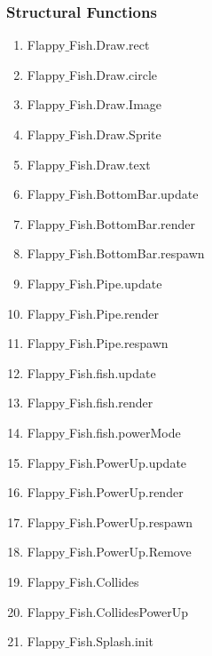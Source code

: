 \documentclass[11pt, oneside]{article}   	%
\begin{document}
\subsubsection{Structural Functions}
\begin{enumerate}
\item Flappy$\_$Fish.Draw.rect

\item Flappy$\_$Fish.Draw.circle

\item Flappy$\_$Fish.Draw.Image

\item Flappy$\_$Fish.Draw.Sprite

\item Flappy$\_$Fish.Draw.text

\item Flappy$\_$Fish.BottomBar.update

\item Flappy$\_$Fish.BottomBar.render

\item Flappy$\_$Fish.BottomBar.respawn

\item Flappy$\_$Fish.Pipe.update

\item Flappy$\_$Fish.Pipe.render

\item Flappy$\_$Fish.Pipe.respawn

\item Flappy$\_$Fish.fish.update

\item Flappy$\_$Fish.fish.render

\item Flappy$\_$Fish.fish.powerMode

\item Flappy$\_$Fish.PowerUp.update

\item Flappy$\_$Fish.PowerUp.render

\item Flappy$\_$Fish.PowerUp.respawn

\item Flappy$\_$Fish.PowerUp.Remove

\item Flappy$\_$Fish.Collides

\item Flappy$\_$Fish.CollidesPowerUp

\item Flappy$\_$Fish.Splash.init


\end{enumerate}
\end{document}
